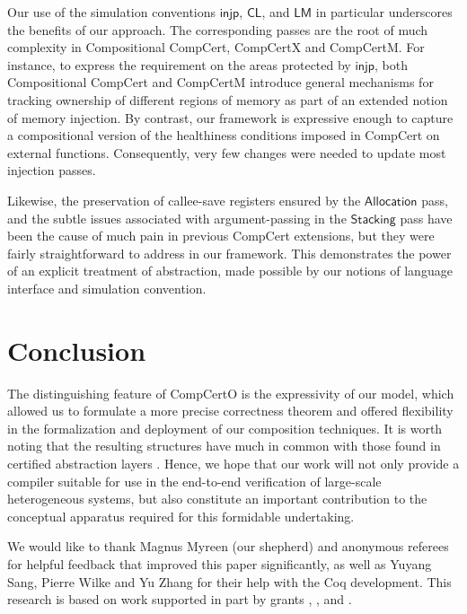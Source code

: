 \documentclass[sigplan,screen,review]{acmart}
\newcommand{\kw}[1]{\ensuremath{ \mathsf{#1} }}
\newcommand{\cc}[2]{{ \kw{#1#2} }}
\begin{document}
Our use of the simulation conventions
\kw{injp}, $\cc{C}{L}$, and $\cc{L}{M}$
in particular
underscores the benefits of our approach.
The corresponding passes are the root of
much complexity
in Compositional CompCert, CompCertX and CompCertM.
For instance,
to express the requirement on
the areas protected by \kw{injp},
both Compositional CompCert and CompCertM
introduce general mechanisms for tracking ownership of
different regions of memory
as part of an extended notion of memory injection.
By contrast,
our framework is expressive enough to capture
a compositional version of the healthiness conditions
imposed in CompCert on external functions.
Consequently,
very few changes were needed to update most injection passes.

Likewise, the preservation of callee-save registers
ensured by the \kw{Allocation} pass,
and the subtle issues associated with argument-passing
in the \kw{Stacking} pass
have been the cause of much pain
in previous CompCert extensions,
but they were fairly straightforward to address
in our framework.
This
demonstrates the power of
an explicit treatment of abstraction,
made possible
by our notions of language interface and simulation convention.



\section{Conclusion} \label{sec:concl} %

The distinguishing feature of CompCertO
is the expressivity of our model,
which allowed us to formulate a more precise correctness theorem
and offered flexibility
in the formalization and deployment of
our composition techniques.
It is worth noting that
the resulting structures have much in common with
those found in
certified abstraction layers \cite{popl15,rbgs-cal}.
Hence,
we hope that our work will not only
provide a compiler
suitable for use in the end-to-end verification of
large-scale heterogeneous systems,
but also constitute an important contribution
to the conceptual apparatus
required for this formidable undertaking.


\begin{acks}
We would like to thank Magnus Myreen (our shepherd) and 
anonymous referees for helpful feedback that
improved this paper significantly,
as well as Yuyang Sang, Pierre Wilke and Yu Zhang
for their help with the Coq development.
This research is based on work supported in part by
 grants
,
, and
.
\end{acks}
\end{document}
